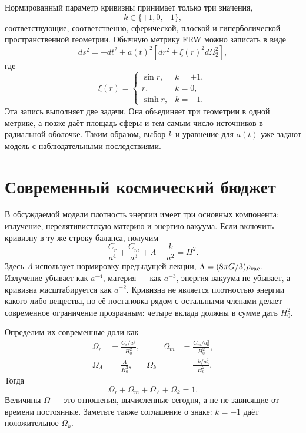 Нормированный параметр кривизны принимает только три значения,
\begin{equation}
k\in\{+1,0,-1\},
\end{equation}
соответствующие, соответственно, сферической, плоской и гиперболической пространственной геометрии. Обычную метрику FRW можно записать в виде
\begin{equation}
ds^2=-dt^2+a(t)^2\left[dr^2+\xi(r)^2d\Omega_2^2\right],
\label{eq:c06-frw}
\end{equation}
где
\begin{equation}
\xi(r)=
\begin{cases}
\sin r, & k=+1,\\
r, & k=0,\\
\sinh r, & k=-1.
\end{cases}
\label{eq:c06-xi}
\end{equation}
Эта запись выполняет две задачи. Она объединяет три геометрии в одной метрике, а позже даёт площадь сферы и тем самым число источников в радиальной оболочке. Таким образом, выбор \(k\) и уравнение для \(a(t)\) уже задают модель с наблюдательными последствиями.

\section{Современный космический бюджет}

В обсуждаемой модели плотность энергии имеет три основных компонента: излучение, нерелятивистскую материю и энергию вакуума. Если включить кривизну в ту же строку баланса, получим
\begin{equation}
\frac{C_r}{a^4}
+\frac{C_m}{a^3}
+\Lambda
-\frac{k}{a^2}
=H^2.
\label{eq:c06-budget}
\end{equation}
Здесь \(\Lambda\) использует нормировку предыдущей лекции, \(\Lambda=(8\pi G/3)\rho_{\rm vac}\). Излучение убывает как \(a^{-4}\), материя — как \(a^{-3}\), энергия вакуума не убывает, а кривизна масштабируется как \(a^{-2}\). Кривизна не является плотностью энергии какого-либо вещества, но её постановка рядом с остальными членами делает современное ограничение прозрачным: четыре вклада должны в сумме дать \(H_0^2\).

Определим их современные доли как
\begin{equation}
\begin{aligned}
\Omega_r&=\frac{C_r/a_0^4}{H_0^2},
&\qquad
\Omega_m&=\frac{C_m/a_0^3}{H_0^2},\\
\Omega_\Lambda&=\frac{\Lambda}{H_0^2},
&
\Omega_k&=\frac{-k/a_0^2}{H_0^2}.
\end{aligned}
\label{eq:c06-omegas}
\end{equation}
Тогда
\begin{equation}
\boxed{\Omega_r+\Omega_m+\Omega_\Lambda+\Omega_k=1.}
\label{eq:c06-sum-rule}
\end{equation}
Величины \(\Omega\) — это отношения, вычисленные сегодня, а не не зависящие от времени постоянные. Заметьте также соглашение о знаке: \(k=-1\) даёт положительное \(\Omega_k\).

